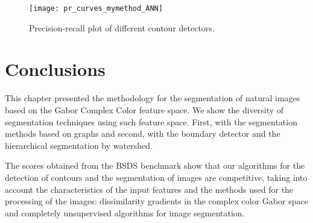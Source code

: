 \begin{figure}[!ht]
	\centering
	\texttt{[image: pr\_curves\_mymethod\_ANN]}
	\caption{Precision-recall plot of different contour detectors.}\label{fig:pr_curves}
\end{figure}

\section{Conclusions}
This chapter presented the methodology for the segmentation of natural images based on the Gabor Complex Color feature space. We show the diversity of segmentation techniques using such feature space. First, with the segmentation methods based on graphs and second, with the boundary detector and the hierarchical segmentation by watershed.

The scores obtained from the BSDS benchmark show that our algorithms for the detection of contours and the segmentation of images are competitive, taking into account the characteristics of the input features and the methods used for the processing of the images: dissimilarity gradients in the complex color Gabor space and completely unsupervised algorithms for image segmentation.
